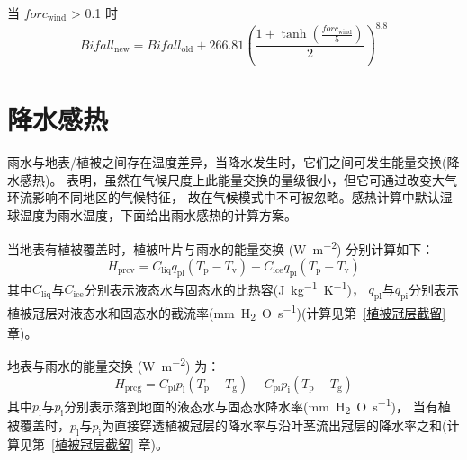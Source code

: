 当 $forc_{\mathrm{wind}}$ > 0.1 时
\begin{equation}
  Bifall_{\mathrm{new}} = Bifall_{\mathrm{old}} + 266.81{\left(\frac{1 + \tanh (\frac{forc_{\mathrm{wind}}}{5})}{2}\right)}^{8.8}
\end{equation}


\section{降水感热}\label{植被地表的雨水感热}
雨水与地表/植被之间存在温度差异，当降水发生时，它们之间可发生能量交换(降水感热)。
\citet{wei2014impact} 表明，虽然在气候尺度上此能量交换的量级很小，但它可通过改变大气环流影响不同地区的气候特征，
故在气候模式中不可被忽略。感热计算中默认湿球温度为雨水温度，下面给出雨水感热的计算方案。

当地表有植被覆盖时，植被叶片与雨水的能量交换 (\unit{W.m^{-2}}) 分别计算如下：
\begin{equation}
  H_{\mathrm{prcv}}=C_{\mathrm{liq}} q_{\mathrm{pl}}\left(T_{\mathrm{p}}-T_{\mathrm{v}}\right)+C_{\mathrm{ice}} q_{\mathrm{pi}}\left(T_{\mathrm{p}}-T_{\mathrm{v}}\right)
\end{equation}
其中$C_{\mathrm{liq}}$与$C_{\mathrm{ice}}$分别表示液态水与固态水的比热容(\unit{J.kg^{-1}.K^{-1}})，
$q_{\mathrm{pl}}$与$q_{\mathrm{pi}}$分别表示植被冠层对液态水和固态水的截流率(\unit{mm.H_2O.s^{-1}})(计算见第~\ref{植被冠层截留} 章)。


地表与雨水的能量交换 (\unit{W.m^{-2}}) 为：
\begin{equation}
  H_{\mathrm{p r c g}}=C_{\mathrm{p l}} p_{\mathrm{l}}\left(T_{\mathrm{p}}-T_{\mathrm{g}}\right)+C_{\mathrm{p i}} p_{\mathrm{i}}\left(T_{\mathrm{p}}-T_{\mathrm{g}}\right)
\end{equation}
其中$p_{\mathrm {l}}$与$p_{\mathrm {i}}$分别表示落到地面的液态水与固态水降水率(\unit{mm.H_2O.s^{-1}})，
当有植被覆盖时，$p_{\mathrm {l}}$与$p_{\mathrm {i}}$为直接穿透植被冠层的降水率与沿叶茎流出冠层的降水率之和(计算见第~\ref{植被冠层截留} 章)。

